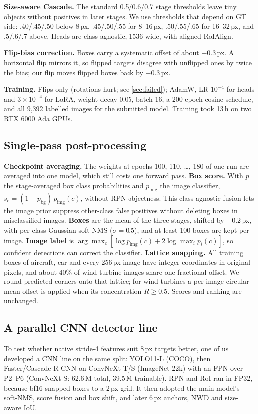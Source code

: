 \documentclass[10pt,twocolumn,letterpaper]{article}
\begin{document}
\textbf{Size-aware Cascade.} The standard 0.5/0.6/0.7 stage thresholds leave tiny objects without positives in later stages. We use thresholds that depend on GT side: .40/.45/.50 below 8\,px, .45/.50/.55 for 8--16\,px, .50/.55/.65 for 16--32\,px, and .5/.6/.7 above. Heads are class-agnostic, 1536 wide, with aligned RoIAlign.

\textbf{Flip-bias correction.} Boxes carry a systematic offset of about $-0.3$\,px. A horizontal flip mirrors it, so flipped targets disagree with unflipped ones by twice the bias; our flip moves flipped boxes back by $-0.3$\,px.

\textbf{Training.} Flips only (rotations hurt; see \cref{sec:failed}); AdamW, LR $10^{-4}$ for heads and $3{\times}10^{-4}$ for LoRA, weight decay 0.05, batch 16, a 200-epoch cosine schedule, and all 9{,}392 labelled images for the submitted model. Training took 13\,h on two RTX 6000 Ada GPUs.

\subsection{Single-pass post-processing}
\label{sec:pp}
\textbf{Checkpoint averaging.} The weights at epochs 100, 110, \dots, 180 of one run are averaged into one model, which still costs one forward pass. \textbf{Box score.} With $p$ the stage-averaged box class probabilities and $p_\text{img}$ the image classifier, $s_c=(1-p_\text{bg})\,p_\text{img}(c)$, without RPN objectness. This class-agnostic fusion lets the image prior suppress other-class false positives without deleting boxes in misclassified images. \textbf{Boxes} are the mean of the three stages, shifted by $-0.2$\,px, with per-class Gaussian soft-NMS ($\sigma{=}0.5$), and at least 100 boxes are kept per image. \textbf{Image label} is $\arg\max_c[\log p_\text{img}(c)+2\log\max_i p_i(c)]$, so confident detections can correct the classifier. \textbf{Lattice snapping.} All training boxes of aircraft, car and every 256\,px image have integer coordinates in original pixels, and about 40\% of wind-turbine images share one fractional offset. We round predicted corners onto that lattice; for wind turbines a per-image circular-mean offset is applied when its concentration $R\ge0.5$. Scores and ranking are unchanged.

\subsection{A parallel CNN detector line}
\label{sec:cnn}
To test whether native stride-4 features suit 8\,px targets better, one of us developed a CNN line on the same split: YOLO11-L (COCO), then Faster/Cascade R-CNN on ConvNeXt-T/S (ImageNet-22k) with an FPN over P2--P6 (ConvNeXt-S: 62.6\,M total, 39.5\,M trainable). RPN and RoI ran in FP32, because bf16 snapped boxes to a 2\,px grid. It then adopted the main model's soft-NMS, score fusion and box shift, and later 6\,px anchors, NWD and size-aware IoU.
\end{document}
